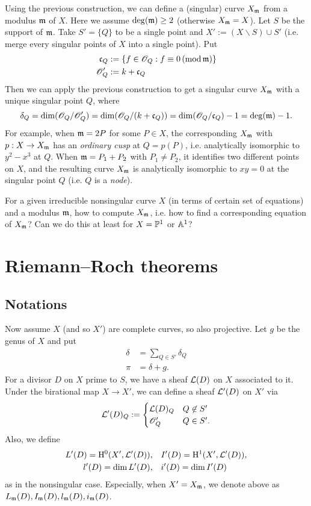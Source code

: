 \documentclass[letterpaper, 12pt]{article}
\begin{document}
Using the previous construction, we can define a (singular) curve $X_{\mathfrak{m}}$ from a modulus $\mathfrak{m}$ of $X$.
Here we assume $\deg(\mathfrak{m}) \ge 2$ (otherwise $X_{\mathfrak{m}} = X$).
Let $S$ be the support of $\mathfrak{m}$.
Take $S' = \{Q\}$ to be a single point and $X' := (X \backslash S) \cup S'$ (i.e. merge every singular points of $X$ into a single point).
Put
\begin{align*}
    \mathfrak{c}_Q &:= \{f \in \mathscr{O}_Q : f \equiv 0\,(\mathrm{mod}\,\mathfrak{m})\} \\
    \mathscr{O}_Q' &:= k + \mathfrak{c}_Q
\end{align*}
Then we can apply the previous construction to get a singular curve $X_{\mathfrak{m}}$ with a unique singular point $Q$, where
$$
\delta_Q = \dim (\mathscr{O}_Q /\mathscr{O}_Q') = \dim (\mathscr{O}_Q / (k + \mathfrak{c}_Q)) = \dim (\mathscr{O}_Q / \mathfrak{c}_Q) - 1 = \deg(\mathfrak{m}) - 1.
$$
For example, when $\mathfrak{m} = 2P$ for some $P \in X$, the corresponding $X_{\mathfrak{m}}$ with $p:X \to X_{\mathfrak{m}}$ has an \emph{ordinary cusp} at $Q = p(P)$, i.e. analytically isomorphic to $y^2 - x^3$ at $Q$.
When $\mathfrak{m} = P_1 + P_2$ with $P_1 \ne P_2$, it identifies two different points on $X$, and the resulting curve $X_{\mathfrak{m}}$ is analytically isomorphic to $xy = 0$ at the singular point $Q$ (i.e. $Q$ is a \emph{node}).

\begin{question}
For a given irreducible nonsingular curve $X$ (in terms of certain set of equations) and a modulus $\mathfrak{m}$, how to compute $X_{\mathfrak{m}}$, i.e. how to find a corresponding equation of $X_{\mathfrak{m}}$?
Can we do this at least for $X = \mathbb{P}^1$ or $\mathbb{A}^1$?
\end{question}


\section{Riemann--Roch theorems}

\subsection{Notations}

Now assume $X$ (and so $X'$) are complete curves, so also projective.
Let $g$ be the genus of $X$ and put
\begin{align*}
    \delta &= \sum_{Q\in S'} \delta_Q \\
    \pi &= \delta + g.
\end{align*}
For a divisor $D$ on $X$ prime to $S$, we have a sheaf $\mathcal{L}(D)$ on $X$ associated to it.
Under the birational map $X \to X'$, we can define a sheaf $\mathcal{L}'(D)$ on $X'$ via
$$
\mathcal{L}'(D)_Q := \begin{cases} \mathcal{L}(D)_Q & Q \not \in S' \\ \mathscr{O}_Q' & Q \in S'. \end{cases}
$$
Also, we define
\begin{align*}
    L'(D) = \mathrm{H}^0(X', \mathcal{L}'(D)), &\quad I'(D) = \mathrm{H}^1(X', \mathcal{L}'(D)),\\
    l'(D) = \dim L'(D), &\quad i'(D) = \dim I'(D)
\end{align*}
as in the nonsingular case.
Especially, when $X' = X_{\mathfrak{m}}$, we denote above as $L_{\mathfrak{m}}(D), I_{\mathfrak{m}}(D), l_{\mathfrak{m}}(D), i_{\mathfrak{m}}(D)$.
\end{document}
